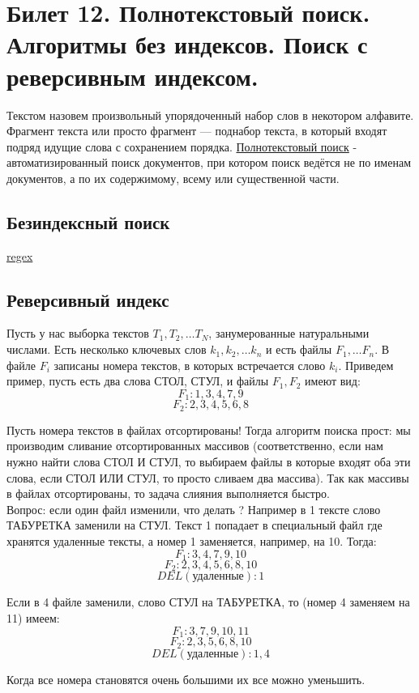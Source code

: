 \newpage
\section {Билет 12. Полнотекстовый поиск. Алгоритмы без индексов. Поиск с реверсивным индексом.}

Текстом назовем произвольный упорядоченный набор слов в некотором алфавите. Фрагмент текста или просто фрагмент — поднабор текста, в который входят подряд идущие слова с сохранением порядка.
\href{https://ru.wikipedia.org/wiki/Полнотекстовый_поиск}{Полнотекстовый поиск} - автоматизированный поиск документов, при котором поиск ведётся не по именам документов, а по их содержимому, всему или существенной части.

\subsection{Безиндексный поиск}
\href{https://habr.com/ru/company/vk/blog/270507/}{regex}

\subsection {Реверсивный индекс}
Пусть у нас выборка текстов $T_1, T_2, \dots T_{N}$, занумерованные натуральными числами. Есть несколько ключевых слов $k_1, k_2, \dots k_n$ и есть файлы $F_1, \dots F_n$. В файле $F_i$ записаны номера текстов, в которых встречается слово $k_i$. Приведем пример, пусть есть два слова СТОЛ, СТУЛ, и файлы $F_1, F_2$  имеют вид: \\
$$ F_1: 1,3,4,7,9 $$
$$ F_2: 2,3,4,5,6,8 $$

Пусть номера текстов в файлах отсортированы!
Тогда алгоритм поиска прост: мы производим сливание отсортированных массивов (соответственно, если нам нужно найти слова СТОЛ И СТУЛ, то выбираем файлы в которые входят оба эти слова, если  СТОЛ ИЛИ СТУЛ, то просто сливаем два массива). Так как массивы в файлах отсортированы, то задача слияния выполняется быстро.\\
Вопрос: если один файл изменили, что делать ? Например в 1 тексте слово ТАБУРЕТКА заменили на СТУЛ. Текст 1 попадает в специальный файл где хранятся удаленные тексты, а номер 1 заменяется, например, на 10. Тогда:
$$ F_1: 3,4,7,9, 10 $$
$$ F_2: 2,3,4,5,6,8,10 $$
$$DEL (\text{удаленные}): 1$$

Если в 4 файле заменили, слово СТУЛ на ТАБУРЕТКА, то (номер 4 заменяем на 11) имеем:
$$ F_1: 3,7,9, 10, 11 $$
$$ F_2: 2,3,5,6,8,10 $$
$$DEL (\text{удаленные}): 1, 4$$

Когда все номера становятся очень большими их все можно уменьшить.